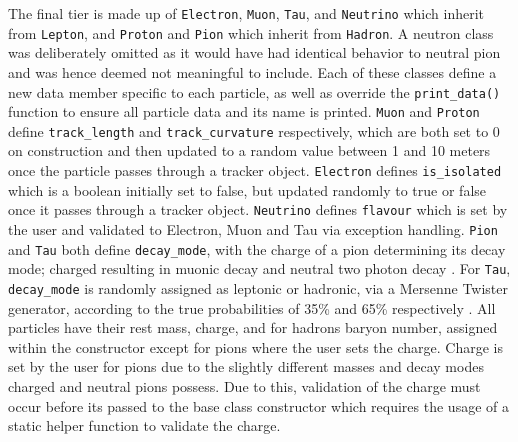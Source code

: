 \documentclass[12pt]{report}
\begin{document}
The final tier is made up of \texttt{Electron}, \texttt{Muon}, \texttt{Tau}, and \texttt{Neutrino} which inherit from \texttt{Lepton}, and \texttt{Proton} and \texttt{Pion} which inherit from \texttt{Hadron}. A neutron class was deliberately omitted as it would have had identical behavior to neutral pion and was hence deemed not meaningful to include. Each of these classes define a new data member specific to each particle, as well as override the \texttt{print\_data()} function to ensure all particle data and its name is printed. \texttt{Muon} and \texttt{Proton} define \texttt{track\_length} and \texttt{track\_curvature} respectively, which are both set to 0 on construction and then updated to a random value between 1 and 10 meters once the particle passes through a tracker object. \texttt{Electron} defines \texttt{is\_isolated} which is a boolean initially set to false, but updated randomly to true or false once it passes through a tracker object. \texttt{Neutrino} defines \texttt{flavour} which is set by the user and validated to Electron, Muon and Tau via exception handling. \texttt{Pion} and \texttt{Tau} both define \texttt{decay\_mode}, with the charge of a pion determining its decay mode; charged resulting in muonic decay and neutral two photon decay \cite{ParticleData}. For \texttt{Tau}, \texttt{decay\_mode} is randomly assigned as leptonic or hadronic, via a Mersenne Twister generator, according to the true probabilities of 35\% and 65\% respectively \cite{ParticleData}. All particles have their rest mass, charge, and for hadrons baryon number, assigned within the constructor except for pions where the user sets the charge. Charge is set by the user for pions due to the slightly different masses and decay modes charged and neutral pions possess. Due to this, validation of the charge must occur before its passed to the base class constructor which requires the usage of a static helper function to validate the charge. 

\end{document}
